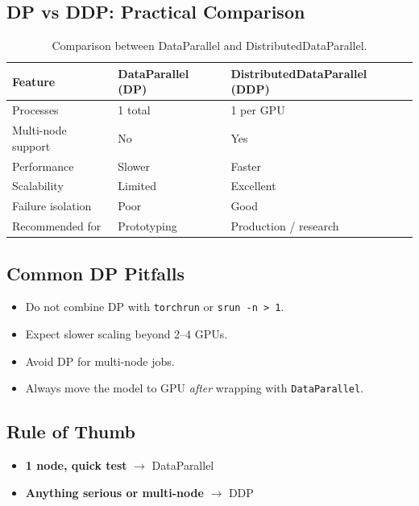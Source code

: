 \documentclass[11pt]{article}
\begin{document}
\subsection{DP vs DDP: Practical Comparison}

\begin{table}[H]
\centering
\begin{tabular}{@{}lll@{}}
\toprule
Feature & DataParallel (DP) & DistributedDataParallel (DDP) \\
\midrule
Processes & 1 total & 1 per GPU \\
Multi-node support & No & Yes \\
Performance & Slower & Faster \\
Scalability & Limited & Excellent \\
Failure isolation & Poor & Good \\
Recommended for & Prototyping & Production / research \\
\bottomrule
\end{tabular}
\caption{Comparison between DataParallel and DistributedDataParallel.}
\end{table}

\subsection{Common DP Pitfalls}
\begin{itemize}[leftmargin=*]
  \item Do not combine DP with \texttt{torchrun} or \texttt{srun -n > 1}.
  \item Expect slower scaling beyond 2–4 GPUs.
  \item Avoid DP for multi-node jobs.
  \item Always move the model to GPU \emph{after} wrapping with \texttt{DataParallel}.
\end{itemize}

\subsection{Rule of Thumb}
\begin{itemize}[leftmargin=*]
  \item \textbf{1 node, quick test} $\rightarrow$ DataParallel
  \item \textbf{Anything serious or multi-node} $\rightarrow$ DDP
\end{itemize}
\end{document}
